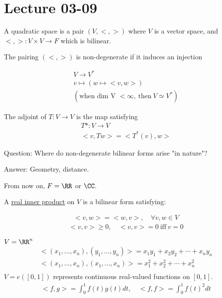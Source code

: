 \documentclass[class=scrartcl, crop=false]{standalone}
\date{2020-03-09}
\begin{document}
\section{Lecture 03-09}

A quadratic space is a pair $(V, <, >)$ where $V$ is a vector space, and $<, >: V \times V \to F$ which is bilinear.

The pairing $(<, >)$ is non-degenerate if it induces an injection

\begin{gather*}
  V \to V^* \\
  v \mapsto (w \mapsto <v, w>) \\
  (\text{when dim V } < \infty, \ \text{then} \  V \simeq V^*)
\end{gather*} 

The adjoint of $T: V \to V$ is the map satisfying
\begin{gather*}
  T*: V \to V  \\
  <v, Tw> = <T^*(v), w>
\end{gather*} 

Question: Where do non-degenerate bilinear forms arise "in nature"?

Answer: Geometry, distance.

From now on, $F = \RR$ or $\CC$.

\begin{definition}
  A \ul{real inner product} on $V$ is a bilinear form satisfying:
  \begin{enumerate}
    \ii
    \begin{gather*}
      <v, w> = <w, v>, \quad \forall v, w \in V
    \end{gather*} 
    \ii
    \begin{gather*}
      <v, v> \geq 0, \quad <v, v> = 0 \ \text{iff} \ v = 0
    \end{gather*} 
  \end{enumerate} 
\end{definition} 

\begin{example}
  \begin{enumerate}
    \ii
    $V = \RR^n$
     \begin{gather*}
      <(x_1, \dots, x_n), (y_1, \dots, y_n)> = x_1y_1 + x_2y_2 + \cdots + x_ny_n \\
      <(x_1, \dots, x_n), (x_1, \dots, x_n)> = x_1^2 + x_2^2 + \cdots + x_n^2 \\
    \end{gather*} 
    \ii
    $V = e([0, 1])$ represents continuous real-valued functions on $[0, 1]$.
    \begin{gather*}
      <f, g> = \int_0^1f(t)g(t)dt, \quad <f, f> = \int_0^1f(t)^2dt
    \end{gather*} 
  \end{enumerate} 
\end{example} 
\end{document}
